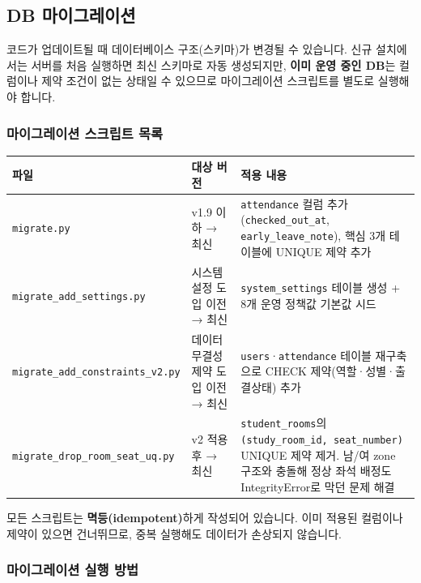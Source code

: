 \documentclass[a4paper,12pt]{article}
\begin{document}
\subsection{DB 마이그레이션}

코드가 업데이트될 때 데이터베이스 구조(스키마)가 변경될 수 있습니다.
신규 설치에서는 서버를 처음 실행하면 최신 스키마로 자동 생성되지만,
\textbf{이미 운영 중인 DB}는 컬럼이나 제약 조건이 없는 상태일 수 있으므로
마이그레이션 스크립트를 별도로 실행해야 합니다.

\subsubsection*{마이그레이션 스크립트 목록}

\begin{center}
\begin{tabularx}{\textwidth}{llX}
\toprule
\textbf{파일} & \textbf{대상 버전} & \textbf{적용 내용} \\
\midrule
\texttt{migrate.py} & v1.9 이하 → 최신 &
  \texttt{attendance} 컬럼 추가(\texttt{checked\_out\_at}, \texttt{early\_leave\_note}),
  핵심 3개 테이블에 UNIQUE 제약 추가 \\
\texttt{migrate\_add\_settings.py} & 시스템 설정 도입 이전 → 최신 &
  \texttt{system\_settings} 테이블 생성 + 8개 운영 정책값 기본값 시드 \\
\texttt{migrate\_add\_constraints\_v2.py} & 데이터 무결성 제약 도입 이전 → 최신 &
  \texttt{users}·\texttt{attendance} 테이블 재구축으로 CHECK 제약(역할·성별·출결상태) 추가 \\
\texttt{migrate\_drop\_room\_seat\_uq.py} & v2 적용 후 → 최신 &
  \texttt{student\_rooms}의 \texttt{(study\_room\_id, seat\_number)} UNIQUE 제약 제거.
  남/여 zone 구조와 충돌해 정상 좌석 배정도 IntegrityError로 막던 문제 해결 \\
\bottomrule
\end{tabularx}
\end{center}

\begin{notebox}
  모든 스크립트는 \textbf{멱등(idempotent)}하게 작성되어 있습니다.
  이미 적용된 컬럼이나 제약이 있으면 건너뛰므로, 중복 실행해도 데이터가 손상되지 않습니다.
\end{notebox}

\subsubsection*{마이그레이션 실행 방법}
\end{document}

